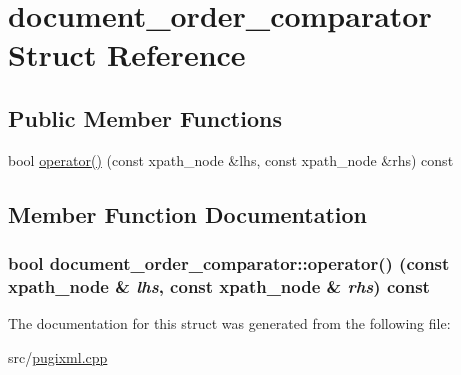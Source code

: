 \hypertarget{structdocument__order__comparator}{
\section{document\_\-order\_\-comparator Struct Reference}
\label{structdocument__order__comparator}
}
\subsection*{Public Member Functions}
\begin{DoxyCompactItemize}
\item 
bool \hyperlink{structdocument__order__comparator_a11e471cbfa426bc9e48844c1db1a190e}{operator()} (const xpath\_\-node \&lhs, const xpath\_\-node \&rhs) const 
\end{DoxyCompactItemize}


\subsection{Member Function Documentation}
\hypertarget{structdocument__order__comparator_a11e471cbfa426bc9e48844c1db1a190e}{
\subsubsection[{operator()}]{\setlength{\rightskip}{0pt plus 5cm}bool document\_\-order\_\-comparator::operator() (const xpath\_\-node \& {\em lhs}, \/  const xpath\_\-node \& {\em rhs}) const}}
\label{structdocument__order__comparator_a11e471cbfa426bc9e48844c1db1a190e}


The documentation for this struct was generated from the following file:\begin{DoxyCompactItemize}
\item 
src/\hyperlink{pugixml_8cpp}{pugixml.cpp}\end{DoxyCompactItemize}
